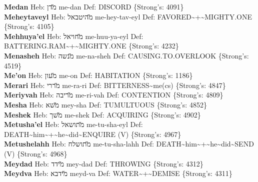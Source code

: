 {\textbf{Medan} Heb: {\large\H מדן} me-dan Def: DISCORD \{Strong's: 4091\}\hfill{}\\

\textbf{Meheytaveyl} Heb: {\large\H מהיטבאל} me-hey-tav-eyl Def: FAVORED\textasciitilde{}+\textasciitilde{}MIGHTY.ONE \{Strong's: 4105\}\hfill{}\\

\textbf{Mehhuya'el} Heb: {\large\H מחויאל} me-huu-ya-eyl Def: BATTERING.RAM\textasciitilde{}+\textasciitilde{}MIGHTY.ONE \{Strong's: 4232\}\hfill{}\\

\textbf{Menasheh} Heb: {\large\H מנשה} me-na-sheh Def: CAUSING.TO.OVERLOOK \{Strong's: 4519\}\hfill{}\\

\textbf{Me'on} Heb: {\large\H מעון} me-on Def: HABITATION \{Strong's: 1186\}\hfill{}\\

\textbf{Merari} Heb: {\large\H מררי} me-ra-ri Def: BITTERNESS\textasciitilde{}me(cs) \{Strong's: 4847\}\hfill{}\\

\textbf{Meriyvah} Heb: {\large\H מריבה} me-ri-vah Def: CONTENTION \{Strong's: 4809\}\hfill{}\\

\textbf{Mesha} Heb: {\large\H משא} mey-sha Def: TUMULTUOUS \{Strong's: 4852\}\hfill{}\\

\textbf{Meshek} Heb: {\large\H משך} me-shek Def: ACQUIRING \{Strong's: 4902\}\hfill{}\\

\textbf{Metusha'el} Heb: {\large\H מתושאל} me-tu-sha-eyl Def: DEATH\textasciitilde{}him\textasciitilde{}+\textasciitilde{}he\textasciitilde{}did\textasciitilde{}ENQUIRE (V) \{Strong's: 4967\}\hfill{}\\

\textbf{Metushelahh} Heb: {\large\H מתושלח} me-tu-sha-lahh Def: DEATH\textasciitilde{}him\textasciitilde{}+\textasciitilde{}he\textasciitilde{}did\textasciitilde{}SEND (V) \{Strong's: 4968\}\hfill{}\\

\textbf{Meydad} Heb: {\large\H מידד} mey-dad Def: THROWING \{Strong's: 4312\}\hfill{}\\

\textbf{Meydva} Heb: {\large\H מידבא} meyd-va Def: WATER\textasciitilde{}+\textasciitilde{}DEMISE \{Strong's: 4311\}\hfill{}\\

}

